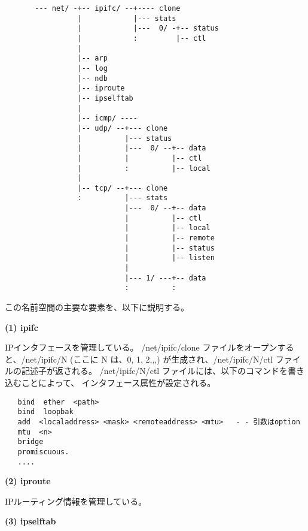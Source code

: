 {\small
\begin{verbatim}
       --- net/ -+-- ipifc/ --+---- clone                       
                 |            |--- stats                 
                 |            |---  0/ -+-- status         
                 |            :         |-- ctl          
                 |
                 |-- arp                                 
                 |-- log                                 
                 |-- ndb                                 
                 |-- iproute                             
                 |-- ipselftab                           
                 |                                      
                 |-- icmp/ ----                           
                 |-- udp/ --+--- clone                    
                 |          |--- status     
                 |          |---  0/ --+-- data           
                 |          |          |-- ctl          
                 |          :          |-- local        
                 | 
                 |-- tcp/ --+--- clone                    
                 :          |--- stats                 
                            |---  0/ --+-- data           
                            |          |-- ctl          
                            |          |-- local        
                            |          |-- remote       
                            |          |-- status       
                            |          |-- listen
                            |
                            |--- 1/ ---+-- data
                            :          :
\end{verbatim}
}


この名前空間の主要な要素を、以下に説明する。


{\bf \flushleft(1) ipifc}

  IPインタフェースを管理している。
  /net/ipifc/clone ファイルをオープンすると、/net/ipifc/N (ここに N は、0, 1, 2,,,) 
  が生成され、/net/ipifc/N/ctl ファイルの記述子が返される。
  /net/ipifc/N/ctl ファイルには、以下のコマンドを書き込むことによって、
  インタフェース属性が設定される。
\begin{verbatim}
   bind  ether  <path>
   bind  loopbak
   add  <localaddress> <mask> <remoteaddress> <mtu>   - - 引数はoption
   mtu  <n>
   bridge
   promiscuous.
   ....
\end{verbatim}

{\bf \flushleft(2) iproute}

   IPルーティング情報を管理している。

{\bf \flushleft(3) ipselftab}

